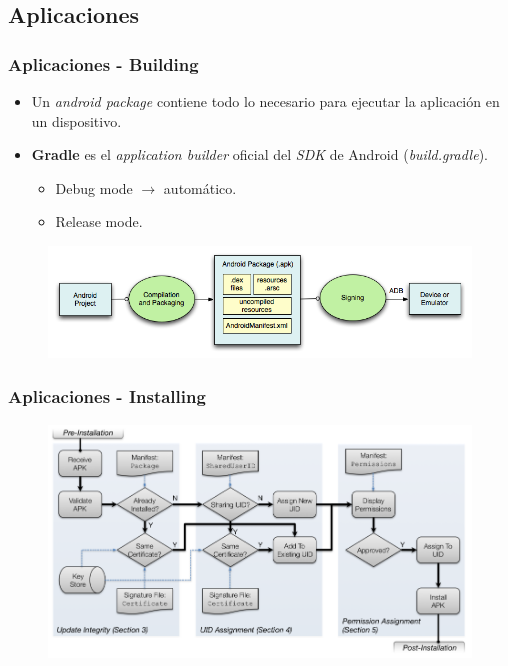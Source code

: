 \subsection{Aplicaciones}
\begin{frame}
  \frametitle{Aplicaciones - Building}
  \begin{itemize}
    \item Un \textit{android package} contiene todo lo necesario para ejecutar la aplicación en un dispositivo.
    
    \item \textbf{Gradle} es el \textit{application builder} oficial del \textit{SDK} de Android (\textit{build.gradle}).
    \begin{itemize}
  \item Debug mode $\rightarrow$ automático.
  \item Release mode.
    \end{itemize}
  \end{itemize}
  
  \begin{figure}
    \centering
    \includegraphics[scale=0.4]{images/build-app.png}
  \end{figure} 
\end{frame}

\begin{frame}
  \frametitle{Aplicaciones - Installing}
  \begin{figure}
    \centering
    \includegraphics[scale=0.3]{images/install-app.png}
  \end{figure} 
\end{frame}

